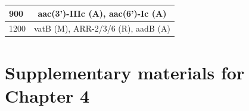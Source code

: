 \begin{table}[!hpt]
\begin{tabular}{|l|c|}
900         & aac(3’)-IIIc (A), aac(6’)-Ic (A)                                                                                                                                                                                                     \\ \hline
1200        & vatB (M), ARR-2/3/6 (R), aadB (A)                                                                                                                                                                                                    \\ \hline
\end{tabular}
\end{table}

\normalsize

\chapter{Supplementary materials for Chapter 4}\label{app:npgraph}
\newpage

\makeatletter

\newlength\oriarrayrulewidth  
\newcount\orilowpenalty
\newcommand\nobreakmidrule{%
 \noalign{\global\oriarrayrulewidth\arrayrulewidth\relax
          \global\orilowpenalty\@lowpenalty\relax  
          \global\@lowpenalty=\numexpr-10000\relax%
          \global\arrayrulewidth\lightrulewidth\relax}
 \hline
 \noalign{\global\@lowpenalty=\orilowpenalty\relax%
          \global\arrayrulewidth\oriarrayrulewidth\relax}}

\makeatother

